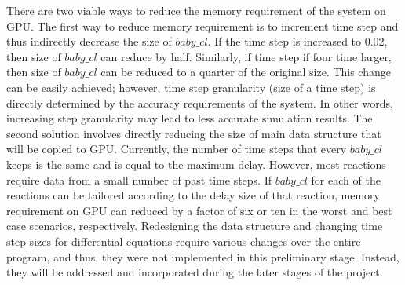 \documentclass[../thesis.tex]{subfiles}
\begin{document}
There are two viable ways to reduce the memory requirement of the system on GPU. The first way to reduce memory requirement is to increment time step and thus indirectly decrease the size of $baby\_cl$. If the time step is increased to 0.02, then size of $baby\_cl$ can reduce by half. Similarly, if time step if four time larger, then size of $baby\_cl$ can be reduced to a quarter of the original size. This change can be easily achieved; however, time step granularity (size of a time step) is directly determined by the accuracy requirements of the system. In other words, increasing step granularity may lead to less accurate simulation results. The second solution involves directly reducing the size of main data structure that will be copied to GPU. Currently, the number of time steps that every $baby\_cl$ keeps is the same and is equal to the maximum delay. However, most reactions require data from a small number of past time steps. If $baby\_cl$ for each of the reactions can be tailored according to the delay size of that reaction, memory requirement on GPU can reduced by a factor of six or ten in the worst and best case scenarios, respectively. Redesigning the data structure and changing time step sizes for differential equations require various changes over the entire program, and thus, they were not implemented in this preliminary stage. Instead, they will be addressed and incorporated during the later stages of the project.
\end{document}

